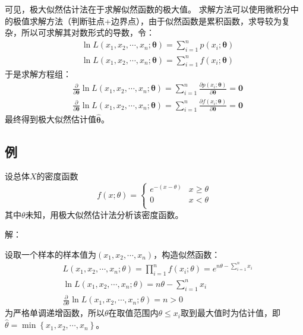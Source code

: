 可见，极大似然估计法在于求解似然函数的极大值。
求解方法可以使用微积分中的极值求解方法（判断驻点+边界点），由于似然函数是累积函数，求导较为复杂，所以可求解其对数形式的导数，令：
\begin{align*}
&\ln L\left( x_1,x_2,\cdots ,x_n;\boldsymbol{\theta } \right) =\sum_{i=1}^n{p\left( x_i;\boldsymbol{\theta } \right)} \\
&\ln L\left( x_1,x_2,\cdots ,x_n;\boldsymbol{\theta } \right) =\sum_{i=1}^n{f\left( x_i;\boldsymbol{\theta } \right)}
\end{align*}
于是求解方程组：
\begin{align*}
&\frac{\partial}{\partial \boldsymbol{\theta }}\ln L\left( x_1,x_2,\cdots ,x_n;\boldsymbol{\theta } \right) =\sum_{i=1}^n{\frac{\partial p\left( x_i;\boldsymbol{\theta } \right)}{\partial \boldsymbol{\theta }}}=\mathbf{0} \\
&\frac{\partial}{\partial \boldsymbol{\theta }}\ln L\left( x_1,x_2,\cdots ,x_n;\boldsymbol{\theta } \right) =\sum_{i=1}^n{\frac{\partial f\left( x_i;\boldsymbol{\theta } \right)}{\partial \boldsymbol{\theta }}}=\mathbf{0}
\end{align*}
最终得到极大似然估计值$\boldsymbol{\hat{\theta}}$。

\subsection{例}

\begin{example}
设总体$X$的密度函数
\[
f\left( x;\theta \right) =\begin{cases}
    e^{-\left( x-\theta \right)}&		x\geqslant \theta\\
    0&		x<\theta\\
\end{cases}
\]
其中$\theta $未知，用极大似然估计法分析该密度函数。
\end{example}

解：

设取一个样本的样本值为$\left( x_1,x_2,\cdots ,x_n \right) $，构造似然函数：
\begin{align*}
&L\left( x_1,x_2,\cdots ,x_n;\theta \right) =\prod_{i=1}^n{f\left( x_i;\theta \right)}=e^{n\theta -\sum_{i=1}^n{x_i}} \\
&\ln L\left( x_1,x_2,\cdots ,x_n;\theta \right) =n\theta -\sum_{i=1}^n{x_i} \\
&\frac{\partial}{\partial \theta}\ln L\left( x_1,x_2,\cdots ,x_n;\theta \right) =n>0
\end{align*}
为严格单调递增函数，所以$\theta $在取值范围内$\theta \leqslant x_i$取到最大值时为估计值，即$\hat{\theta}=\min \left\{ x_1,x_2,\cdots ,x_n \right\} $。

